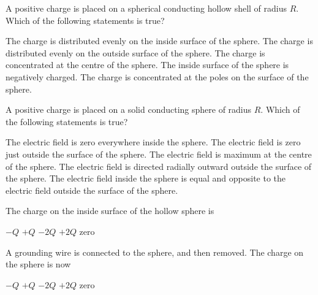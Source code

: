 \documentclass{../../../oss-apphys-exam}
\begin{document}
\begin{questions}
  \question A positive charge is placed on a spherical conducting hollow shell
  of radius $R$. Which of the following statements is true?
  \begin{choices}
    \choice The charge is distributed evenly on the inside surface of the
    sphere.
    \choice The charge is distributed evenly on the outside surface of the
    sphere.
    \choice The charge is concentrated at the centre of the sphere.
    \choice The inside surface of the sphere is negatively charged.
    \choice The charge is concentrated at the poles on the surface of the
    sphere.
  \end{choices}
  
  \question A positive charge is placed on a solid conducting sphere of radius
  $R$. Which of the following statements is true?
  \begin{choices}
    \choice The electric field is zero everywhere inside the sphere.
    \choice The electric field is zero just outside the surface of the sphere.
    \choice The electric field is maximum at the centre of the sphere.
    \choice The electric field is directed radially outward outside the
    surface of the sphere.
    \choice The electric field inside the sphere is equal and opposite to
    the electric field outside the surface of the sphere.
  \end{choices}
  
  
  \question The charge on the inside surface of the hollow sphere is
  \begin{choices}
    \choice $-Q$
    \choice $+Q$
    \choice $-2Q$
    \choice $+2Q$
    \choice zero
  \end{choices}
  \label{cond1}
  
  \question A grounding wire is connected to the sphere, and then removed. The
  charge on the sphere is now
  \begin{choices}
    \choice $-Q$
    \choice $+Q$
    \choice $-2Q$
    \choice $+2Q$
    \choice zero
  \end{choices}
  \label{cond2}


\end{questions}
\end{document}
